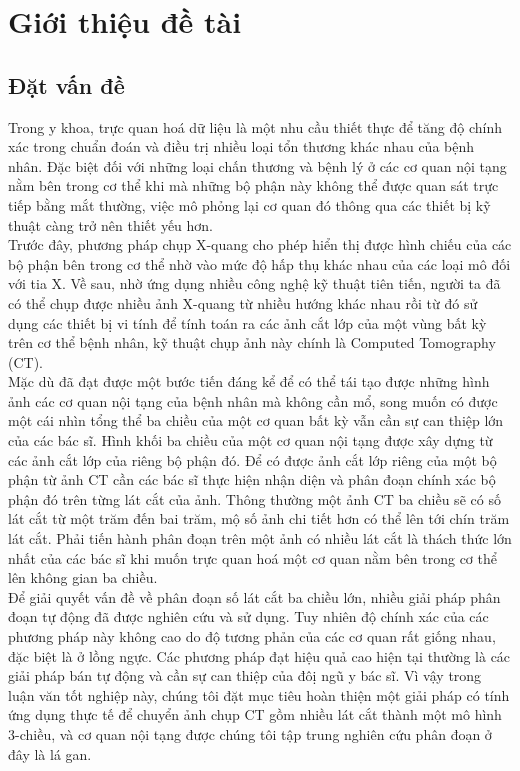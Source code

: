 \chapter{Giới thiệu đề tài}
\section{Đặt vấn đề}
Trong y khoa, trực quan hoá dữ liệu là một nhu cầu thiết thực để tăng độ chính xác trong chuẩn đoán và điều trị nhiều loại tổn thương khác nhau của bệnh nhân. Đặc biệt đối với những loại chấn thương và bệnh lý ở các cơ quan nội tạng nằm bên trong cơ thể khi mà những bộ phận này không thể được quan sát trực tiếp bằng mắt thường, việc mô phỏng lại cơ quan đó thông qua các thiết bị kỹ thuật càng trở nên thiết yếu hơn. \\
Trước đây, phương pháp chụp X-quang cho phép hiển thị được hình chiếu của các bộ phận bên trong cơ thể nhờ vào mức độ hấp thụ khác nhau của các loại mô đối với tia X. Về sau, nhờ ứng dụng nhiều công nghệ kỹ thuật tiên tiến, người ta đã có thể chụp được nhiều ảnh X-quang từ nhiều hướng khác nhau rồi từ đó sử dụng các thiết bị vi tính để tính toán ra các ảnh cắt lớp của một vùng bất kỳ trên cơ thể bệnh nhân, kỹ thuật chụp ảnh này chính là Computed Tomography (CT).\\
Mặc dù đã đạt được một bước tiến đáng kể để có thể tái tạo được những hình ảnh các cơ quan nội tạng của bệnh nhân mà không cần mổ, song muốn có được một cái nhìn tổng thể ba chiều của một cơ quan bất kỳ vẫn cần sự can thiệp lớn của các bác sĩ. Hình khối ba chiều của một cơ quan nội tạng được xây dựng từ các ảnh cắt lớp của riêng bộ phận đó. Để có được ảnh cắt lớp riêng của một bộ phận từ ảnh CT cần các bác sĩ thực hiện nhận diện và phân đoạn chính xác bộ phận đó trên từng lát cắt của ảnh. Thông thường một ảnh CT ba chiều sẽ có số lát cắt từ một trăm đến bai trăm, mộ số ảnh chi tiết hơn có thể lên tới chín trăm lát cắt. Phải tiến hành phân đoạn trên một ảnh có nhiều lát cắt là thách thức lớn nhất của các bác sĩ khi muốn trực quan hoá một cơ quan nằm bên trong cơ thể lên không gian ba chiều.\\
Để giải quyết vấn đề về phân đoạn số lát cắt ba chiều lớn, nhiều giải pháp phân đoạn tự động đã được nghiên cứu và sử dụng. Tuy nhiên độ chính xác của các phương pháp này không cao do độ tương phản của các cơ quan rất giống nhau, đặc biệt là ở lồng ngực. Các phương pháp đạt hiệu quả cao hiện tại thường là các giải pháp bán tự động và cần sự can thiệp của đôị ngũ y bác sĩ. Vì vậy trong luận văn tốt nghiệp này, chúng tôi đặt mục tiêu hoàn thiện một giải pháp có tính ứng dụng thực tế để chuyển ảnh chụp CT gồm nhiều lát cắt thành một mô hình 3-chiều, và cơ quan nội tạng được chúng tôi tập trung nghiên cứu phân đoạn ở đây là lá gan.
